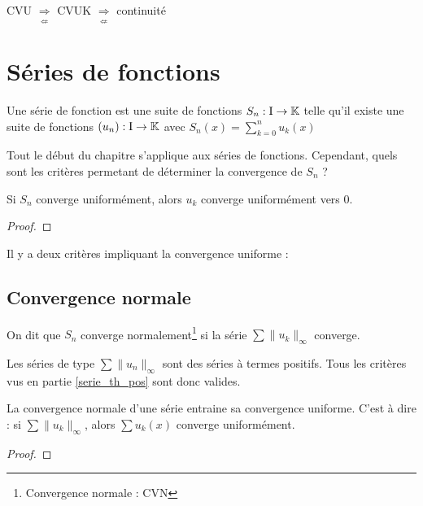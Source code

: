 \begin{rem}
	CVU $\underset{\nLeftarrow}{\Rightarrow}$ CVUK $\underset{\nLeftarrow}{\Rightarrow}$ continuité
\end{rem}

\section{Séries de fonctions}
\begin{defi}
Une série de fonction est une suite de fonctions $S_n:\text{I}\to\mathbb{K}$ telle qu'il existe une suite de fonctions $(u_n):\text{I}\to\mathbb{K}$ avec $S_n(x)=\sum\limits_{k=0}^{n}u_k(x)$
\end{defi}
\begin{rem}
	Tout le début du chapitre s'applique aux séries de fonctions. Cependant, quels sont les critères permetant de déterminer la convergence de $S_n$ ?
\end{rem}
\begin{propo}
	Si $S_n$ converge uniformément, alors $u_k$ converge uniformément vers 0.
\end{propo}
\begin{proof}
\end{proof}
Il y a deux critères impliquant la convergence uniforme :
\subsection{Convergence normale}
\begin{defi}
On dit que $S_n$ converge normalement\footnote{Convergence normale : CVN} si la série $\sum\|u_k\|_\infty$ converge.
\end{defi}

\begin{inter}
Les séries de type $\sum\|u_n\|_\infty$ sont des séries à termes positifs. Tous les critères vus en partie \ref{serie_th_pos} sont donc valides.
\end{inter}
\begin{thm}
La convergence normale d'une série entraine sa convergence uniforme. C'est à dire :
 si $\sum\|u_k\|_\infty$, alors $\sum u_k(x)$ converge uniformément.
\end{thm}

\begin{proof}\end{proof}

